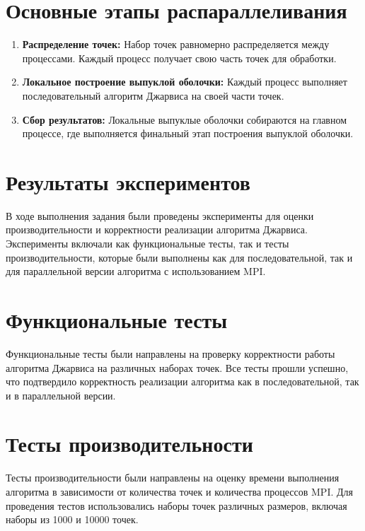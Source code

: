 \documentclass[12pt]{article}
\begin{document}
\section*{Основные этапы распараллеливания}

\begin{enumerate}[leftmargin=*,itemsep=5pt]
\item \textbf{Распределение точек:} Набор точек равномерно распределяется между процессами. Каждый процесс получает свою часть точек для обработки.
\item \textbf{Локальное построение выпуклой оболочки:} Каждый процесс выполняет последовательный алгоритм Джарвиса на своей части точек.
\item \textbf{Сбор результатов:} Локальные выпуклые оболочки собираются на главном процессе, где выполняется финальный этап построения выпуклой оболочки.
\end{enumerate}

\section*{Результаты экспериментов}

В ходе выполнения задания были проведены эксперименты для оценки производительности и корректности реализации алгоритма Джарвиса. Эксперименты включали как функциональные тесты, так и тесты производительности, которые были выполнены как для последовательной, так и для параллельной версии алгоритма с использованием MPI.

\section*{Функциональные тесты}

Функциональные тесты были направлены на проверку корректности работы алгоритма Джарвиса на различных наборах точек. Все тесты прошли успешно, что подтвердило корректность реализации алгоритма как в последовательной, так и в параллельной версии.

\section*{Тесты производительности}

Тесты производительности были направлены на оценку времени выполнения алгоритма в зависимости от количества точек и количества процессов MPI. Для проведения тестов использовались наборы точек различных размеров, включая наборы из 1000 и 10000 точек.
\end{document}
